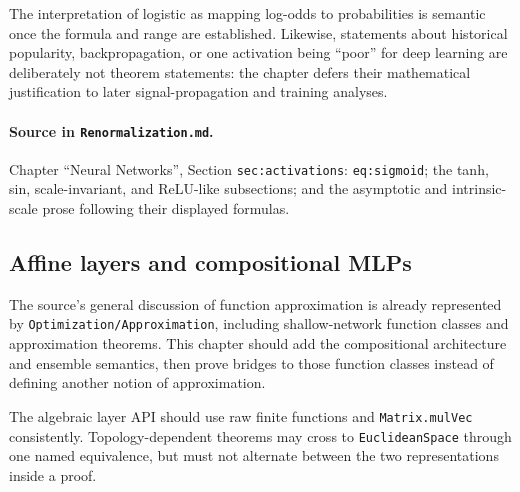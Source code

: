 \begin{theorem}
The interpretation of logistic as mapping log-odds to probabilities is semantic once the formula
and range are established.  Likewise, statements about historical popularity, backpropagation,
or one activation being ``poor'' for deep learning are deliberately not theorem statements: the
chapter defers their mathematical justification to later signal-propagation and training analyses.

\paragraph{Source in \texttt{Renormalization.md}.}
Chapter ``Neural Networks'', Section \texttt{sec:activations}: \texttt{eq:sigmoid}; the tanh, sin,
scale-invariant, and ReLU-like subsections; and the asymptotic and intrinsic-scale prose following
their displayed formulas.
\end{theorem}

\subsection{Affine layers and compositional MLPs}

The source's general discussion of function approximation is already represented by
\texttt{Optimization/Approximation}, including shallow-network function classes and approximation
theorems.  This chapter should add the compositional architecture and ensemble semantics, then
prove bridges to those function classes instead of defining another notion of approximation.

The algebraic layer API should use raw finite functions and \texttt{Matrix.mulVec} consistently.
Topology-dependent theorems may cross to \texttt{EuclideanSpace} through one named equivalence, but
must not alternate between the two representations inside a proof.

